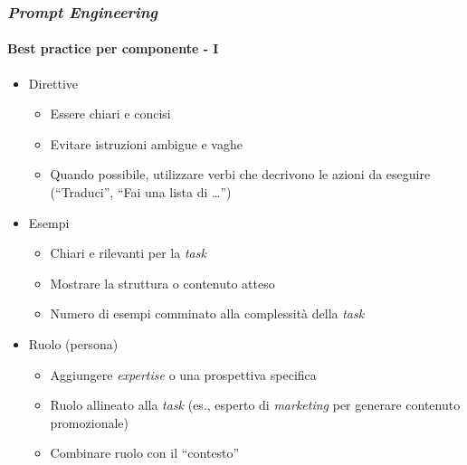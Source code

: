 %
\begin{frame}[t] \frametitle{\emph{Prompt Engineering}}
\framesubtitle{Best practice per componente - I}
\vspace*{-15pt}
{\small
{}
    \begin{minipage}[t]{\textwidth}
        \begin{itemize}[leftmargin=10pt,align=right]
            \item[\alert{\faArrowCircleRight}] Direttive
            \begin{itemize}[leftmargin=10pt,align=right]
                \item[\alert{\faExclamationTriangle}] Essere chiari e concisi
                \item[\alert{\faExclamationTriangle}] Evitare istruzioni ambigue e vaghe
                \item[\alert{\faExclamationTriangle}] Quando possibile, utilizzare verbi che decrivono le azioni da eseguire (``Traduci'', ``Fai una lista di \ldots'')
            \end{itemize}
            \item[\alert{\faArrowCircleRight}] Esempi
            \begin{itemize}[leftmargin=10pt,align=right]
                \item[\alert{\faExclamationTriangle}] Chiari e rilevanti per la \textit{task}
                \item[\alert{\faExclamationTriangle}] Mostrare la struttura o contenuto atteso
                \item[\alert{\faExclamationTriangle}] Numero di esempi comminato alla complessità della \textit{task}
            \end{itemize}
            \item[\alert{\faArrowCircleRight}] Ruolo (persona)
            \begin{itemize}[leftmargin=10pt,align=right]
                \item[\alert{\faExclamationTriangle}] Aggiungere \textit{expertise} o una prospettiva specifica
                \item[\alert{\faExclamationTriangle}] Ruolo allineato alla \textit{task} (es., esperto di \textit{marketing} per generare contenuto promozionale)
                \item[\alert{\faExclamationTriangle}] Combinare ruolo con il ``contesto''
            \end{itemize}
        \end{itemize}        
    \end{minipage}
}
\end{frame}

